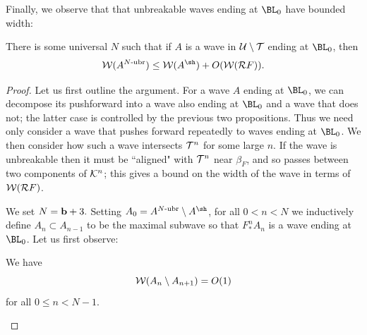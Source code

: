 \documentclass[12pt]{amsart}
\begin{document}
Finally, we observe that that unbreakable waves ending at $\BL_0$ have bounded width:
\begin{prop}\label{prop:into the critical limb}
	There is some universal $N$ such that if $A$ is a wave in $\mathcal U\setminus \mathcal T$  ending at $\BL_0$, then $$\WW(A^{N\mathhyphen\nbr})\leq \WW(A^\sh)+ O(\WW(\RR F)).$$
\end{prop}

\begin{proof}
    Let us first outline the argument.
    For a wave $A$ ending at $\BL_0$, 
    we can decompose its pushforward into a wave also ending at $\BL_0$ and a wave that does not; the latter case is controlled by the previous two propositions. Thus we need only consider a wave that pushes forward repeatedly to waves ending at $\BL_0$. We then consider how such a wave intersects $\mathcal T^n$ for some large $n$. If the wave is unbreakable then it must be ``aligned" with $\mathcal T^n$ near $\beta_F$, and so passes between two components of $\mathcal K^n$; this gives a bound on the width of the wave in terms of $\mathcal W(\mathcal R F)$.




	We set $N = \mathbf b+3.$
	Setting $A_0= A^{N\mathhyphen\nbr}\sm A^\sh$, for all $0< n < N$ we inductively define $A_n\subset A_{n-1}$ to be the maximal subwave so that $F_*^nA_n$ is a wave ending at $\BL_0$. 
	Let us first observe:
    \begin{lemma}
        We have
        \begin{equation}\label{eq:into critical bound}
		\mathcal W(A_{n}\setminus A_{n+1})= O(1)
	\end{equation}
	for all $0\leq n < N-1$.
    \end{lemma}


\end{proof}
\end{document}
